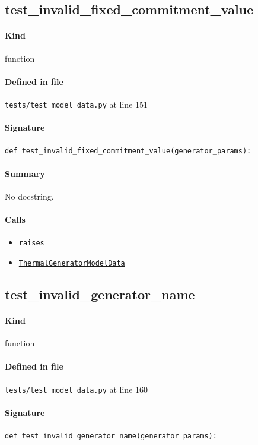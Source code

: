 \documentclass[11pt]{report}
\begin{document}
\subsection{test\_invalid\_fixed\_commitment\_value}
\label{def:tests-test_model_data.py:test_invalid_fixed_commitment_value:L151}
\paragraph{Kind} function
\paragraph{Defined in file} \texttt{tests/test\_model\_data.py} at line 151
\paragraph{Signature} \texttt{def test\_invalid\_fixed\_commitment\_value(generator\_params):}
\paragraph{Summary} No docstring.
\paragraph{Calls}
\begin{itemize}[leftmargin=*]
  \item \texttt{raises}
  \item \hyperref[def:model_data.py:ThermalGeneratorModelData:L185]{\texttt{ThermalGeneratorModelData}}
\end{itemize}
\subsection{test\_invalid\_generator\_name}
\label{def:tests-test_model_data.py:test_invalid_generator_name:L160}
\paragraph{Kind} function
\paragraph{Defined in file} \texttt{tests/test\_model\_data.py} at line 160
\paragraph{Signature} \texttt{def test\_invalid\_generator\_name(generator\_params):}
\end{document}
